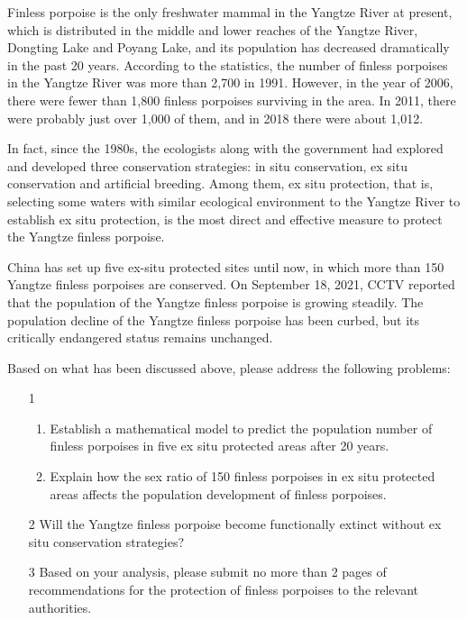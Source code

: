 \documentclass{mcmthesis}
\numberwithin{figure}{section}
\numberwithin{table}{section}
\numberwithin{equation}{section}
\begin{document}
Finless porpoise is the only freshwater mammal in the Yangtze River at present, 
which is distributed in the middle and lower reaches of the Yangtze 
River, Dongting Lake and Poyang Lake, and its population has 
decreased dramatically in the past 20 years. According to the statistics, 
the number of finless porpoises in the Yangtze River was more than 2,700 in 1991. 
However, in the year of 2006, there were fewer than 1,800 finless porpoises surviving in the area. 
In 2011, there were probably just over 1,000 of them, and in 2018 there were about 1,012. 
\par
In fact, since the 1980s, the ecologists along with the government
had explored and developed three conservation strategies: 
in situ conservation, ex situ conservation and artificial breeding.
Among them, ex situ protection, that is, selecting some waters with 
similar ecological environment to the Yangtze River to establish 
ex situ protection, is the most direct and effective measure
to protect the Yangtze finless porpoise. 
\par
China has set up five ex-situ protected sites until now, in which 
more than 150 Yangtze finless porpoises are conserved. On September 18, 2021, CCTV reported that 
the population of the Yangtze finless porpoise is growing steadily. 
The population decline of the Yangtze finless porpoise has been 
curbed, but its critically endangered status remains unchanged.
\par
Based on what has been discussed above, please address the following problems:
\begin{enumerate}
  \item [1] \begin{enumerate}
    \item Establish a mathematical model to predict the population number of finless porpoises in five ex situ protected areas after 20 years.
    \item Explain how the sex ratio of 150 finless porpoises in ex situ protected areas affects the population development of finless porpoises.
  \end{enumerate}
  \item [2] Will the Yangtze finless porpoise become functionally extinct without ex situ conservation strategies?
  \item [3] Based on your analysis, please submit no more than 2 pages of recommendations for the protection of finless porpoises to the relevant authorities.
\end{enumerate}
\end{document}
